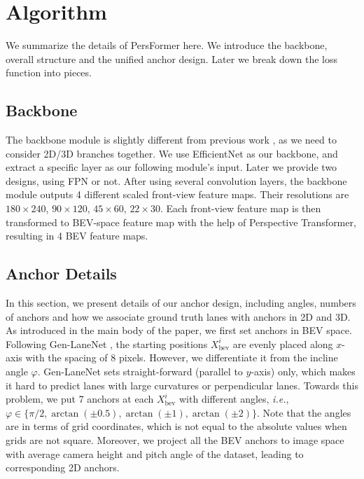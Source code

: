 \documentclass[runningheads]{llncs}
\begin{document}
\section{Algorithm}\label{sec: sup - alg}
We summarize the details of PersFormer here. We introduce the backbone, overall structure and the unified anchor design. Later we break down the loss function into pieces.
\subsection{Backbone}
The backbone module is slightly different from previous work \cite{Garnett_2019_ICCV,guo2020gen}, as we need to consider 2D/3D branches together.
We use EfficientNet \cite{tan2019efficientnet} as our backbone, and extract a specific layer as our following module's input. 
Later we provide two designs, using FPN \cite{lin2017fpn} or not.
After using several convolution layers, the backbone module outputs 4 different scaled front-view feature maps.
Their resolutions are $180 \times 240$, $90 \times 120$, $45 \times 60$, $22 \times 30$.
Each front-view feature map is then transformed to BEV-space feature map with the help of Perspective Transformer, resulting in 4 BEV feature maps.







\subsection{Anchor Details}

In this section, we present details of our anchor design, including angles, numbers of anchors and how we associate ground truth lanes with anchors in 2D and 3D.
As introduced in the main body of the paper, we first set anchors in BEV space.
Following Gen-LaneNet \cite{guo2020gen}, the starting positions $X^i_{\text{bev}}$ are evenly placed along $x$-axis with the spacing of 8 pixels.
However, we differentiate it from the incline angle $\varphi$. Gen-LaneNet sets straight-forward (parallel to $y$-axis) only, which makes it hard to predict lanes with large curvatures or perpendicular lanes.
Towards this problem, we put 7 anchors at each $X^i_{\text{bev}}$ with different angles, \textit{i.e.}, $\varphi \in \{\pi/2, \arctan{(\pm 0.5)}, \arctan{(\pm 1)}, \arctan{(\pm 2)} \}$. Note that the angles are in terms of grid coordinates, which is not equal to the absolute values when grids are not square.
Moreover, we project all the BEV anchors to image space with average camera height and pitch angle of the dataset, leading to corresponding 2D anchors.
\end{document}
